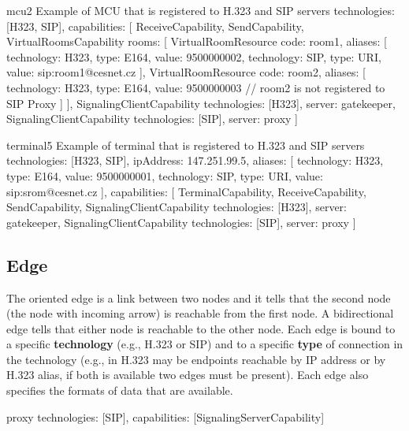 \begin{itemize}
\begin{EntityExample}{}{mcu2}%
      {Example of MCU that is registered to H.323 and SIP servers}
technologies: [H323, SIP],
capabilities: [
  ReceiveCapability,
  SendCapability,
  VirtualRoomsCapability {rooms: [
    VirtualRoomResource {code: room1, aliases: [
      {technology: H323, type: E164, value: 9500000002},
      {technology: SIP, type: URI, value: sip:room1@cesnet.cz}
    ]}, 
    VirtualRoomResource {code: room2, aliases: [
      {technology: H323, type: E164, value: 9500000003}
      // room2 is not registered to SIP Proxy
    ]}
  ]},
  SignalingClientCapability {technologies: [H323], server: gatekeeper},  
  SignalingClientCapability {technologies: [SIP], server: proxy}
]
\end{EntityExample}

\begin{EntityExample}{}{terminal5}%
      {Example of terminal that is registered to H.323 and SIP servers}
technologies: [H323, SIP],
ipAddress: 147.251.99.5,
aliases: [
  {technology: H323, type: E164, value: 9500000001},
  {technology: SIP, type: URI, value: sip:srom@cesnet.cz}
],
capabilities: [
  TerminalCapability,
  ReceiveCapability,
  SendCapability,
  SignalingClientCapability {technologies: [H323], server: gatekeeper},
  SignalingClientCapability {technologies: [SIP], server: proxy}
]
\end{EntityExample}

\end{itemize}
 

\subsection{Edge}

The oriented edge is a link between two nodes and it tells that the second 
node (the node with incoming arrow) is reachable from the first node. A 
bidirectional edge tells that either node is reachable to the other node. 
Each edge is bound to a specific \textbf{technology} (e.g., H.323 or SIP) and 
to a specific \textbf{type} of connection in the technology (e.g., in H.323 
may be endpoints reachable by IP address or by H.323 alias, if both is 
available two edges must be present). Each edge also specifies the formats of data that are available.

\begin{EntityExample}{}{proxy}{}
technologies: [SIP],
capabilities: [SignalingServerCapability]
\end{EntityExample}

